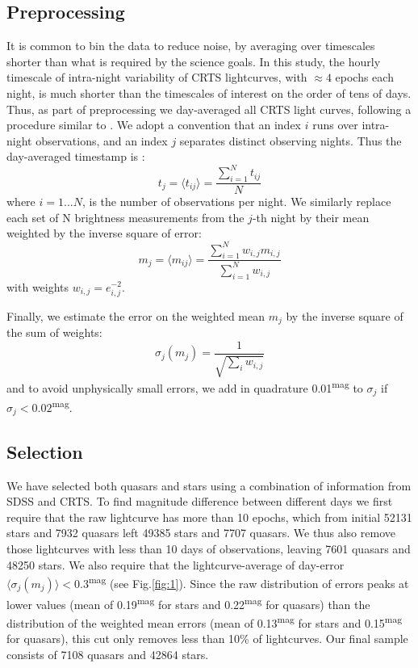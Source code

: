 \documentclass[fleqn,usenatbib]{mnras}  %
\begin{document}
\subsection{Preprocessing}

It is common to bin the data to reduce noise, by averaging over timescales shorter than what is required by the science goals. In this study, the hourly timescale of intra-night variability of CRTS lightcurves, with $\approx 4$ epochs each night, is much shorter than the timescales of interest on the order of tens of days.  Thus, as part of preprocessing we day-averaged all  CRTS light curves, following a procedure similar to \cite{charisi2016}. We adopt a convention that an index  $i$ runs over intra-night observations, and an index $j$ separates distinct observing nights. Thus the day-averaged timestamp is : 
\begin{equation}
t_{j} = \langle t_{ij} \rangle = \frac{\sum_{i=1}^{N}{ t_{ij} }} {N} 
\end{equation}
where $i=1...N$, is the number of observations per night. We similarly replace each set of N brightness measurements from the  $j$-th  night by their mean weighted by the inverse square of error:
\begin{equation}
\label{eq:1}
 m_{j} = \langle m_{ij} \rangle = \frac{\sum_{i=1}^{N} {w_{i,j} m_{i,j}} } {\sum_{i=1}^{N} {w_{i,j}} }
\end{equation}
with weights $w_{i,j} = e_{i,j}^{-2}$.  

Finally, we estimate the error on the weighted mean $m_{j}$ by the inverse square of the sum of weights:  
\begin{equation}
\label{eq:2}
\sigma_{j}(m_{j}) = \frac{1}{\sqrt{\sum_{i}{w_{i,j}}}}
\end{equation} and to avoid unphysically small errors, we add in quadrature 0.01\textsuperscript{mag}  to $\sigma_{j}$ if $\sigma_{j} < 0.02$\textsuperscript{mag}. 


\subsection{Selection}
We have selected both quasars and stars using a combination of information from SDSS and CRTS. To find magnitude difference between different days we first require that the raw lightcurve has more than 10 epochs, which from initial 52131 stars and 7932 quasars left 49385 stars and 7707 quasars. We thus also remove those lightcurves with less than 10 days of observations, leaving 7601 quasars and 48250 stars.  We also require that the lightcurve-average of day-error $\langle \sigma_{j}(m_{j}) \rangle < 0.3$\textsuperscript{mag} (see Fig.\ref{fig:1}). Since the raw distribution of errors peaks at lower values (mean of 0.19\textsuperscript{mag} for stars and 0.22\textsuperscript{mag} for quasars) than the distribution of the weighted mean errors (mean of 0.13\textsuperscript{mag} for stars and 0.15\textsuperscript{mag} for quasars), this cut only removes less than 10\% of lightcurves. Our final sample consists of 7108 quasars and 42864 stars.
\end{document}
